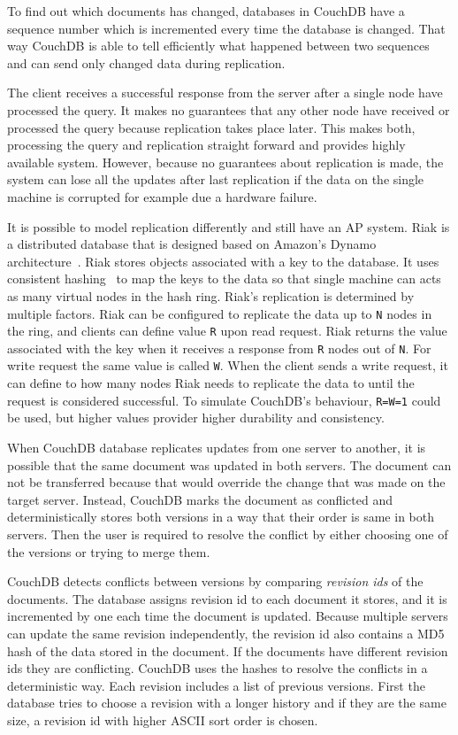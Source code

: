To find out which documents has changed, databases in CouchDB have a sequence
number which is incremented every time the database is changed. That way CouchDB
is able to tell efficiently what happened between two sequences and can send
only changed data during replication.

The client receives a successful response from the server after a single node
have processed the query. It makes no guarantees that any other node have
received or processed the query because replication takes place later. This
makes both, processing the query and replication straight forward and provides
highly available system. However, because no guarantees about replication is
made, the system can lose all the updates after last replication if the data on
the single machine is corrupted for example due a hardware failure.

It is possible to model replication differently and still have an AP system.
Riak is a distributed database that is designed based on Amazon's Dynamo
architecture~\cite{decandia2007dynamo}. Riak stores objects associated with a key
to the database. It uses consistent hashing~\cite{karger1997consistent} to map
the keys to the data so that single machine can acts as many virtual nodes in
the hash ring. Riak's replication is determined by multiple factors. Riak can be
configured to replicate the data up to \texttt{N} nodes in the ring, and clients
can define value \texttt{R} upon read request. Riak returns the value associated
with the key when it receives a response from \texttt{R} nodes out of \texttt{N}.
For write request the same value is called \texttt{W}. When the client sends a
write request, it can define to how many nodes Riak needs to replicate the data
to until the request is considered successful. To simulate CouchDB's behaviour,
\texttt{R=W=1} could be used, but higher values provider higher durability and
consistency.

When CouchDB database replicates updates from one server to another, it is
possible that the same document was updated in both servers. The document can
not be transferred because that would override the change that was made on the
target server. Instead, CouchDB marks the document as conflicted and
deterministically stores both versions in a way that their order is same in both
servers. Then the user is required to resolve the conflict by either choosing
one of the versions or trying to merge them.

CouchDB detects conflicts between versions by comparing \emph{revision ids} of
the documents. The database assigns revision id to each document it stores, and
it is incremented by one each time the document is updated. Because multiple
servers can update the same revision independently, the revision id also
contains a MD5 hash of the data stored in the document. If the documents have
different revision ids they are conflicting. CouchDB uses the hashes to resolve
the conflicts in a deterministic way. Each revision includes a list of previous
versions. First the database tries to choose a revision with a longer history
and if they are the same size, a revision id with higher ASCII sort order is
chosen.


